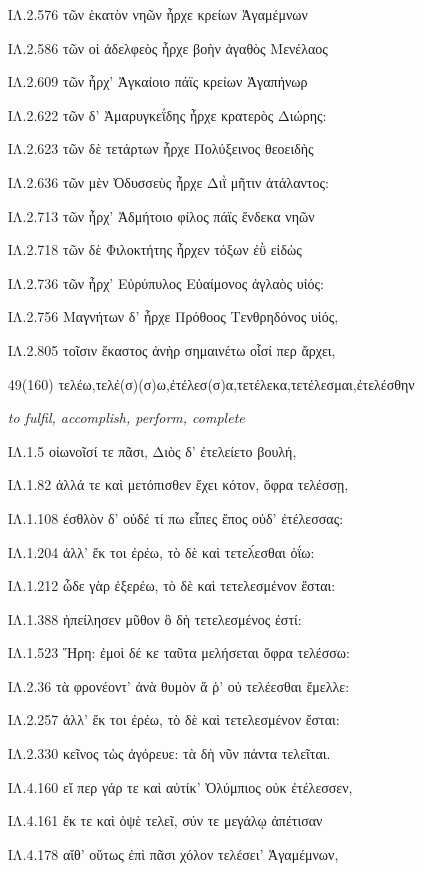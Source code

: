 \begin{enumerate}
{ΙΛ.2.576 τῶν ἑκατὸν νηῶν ἦρχε κρείων Ἀγαμέμνων

ΙΛ.2.586 τῶν οἱ ἀδελφεὸς ἦρχε βοὴν ἀγαθὸς Μενέλαος

ΙΛ.2.609 τῶν ἦρχ' Ἀγκαίοιο πάϊς κρείων Ἀγαπήνωρ

ΙΛ.2.622 τῶν δ' Ἀμαρυγκεΐδης ἦρχε κρατερὸς Διώρης:

ΙΛ.2.623 τῶν δὲ τετάρτων ἦρχε Πολύξεινος θεοειδὴς

ΙΛ.2.636 τῶν μὲν Ὀδυσσεὺς ἦρχε Διῒ μῆτιν ἀτάλαντος:

ΙΛ.2.713 τῶν ἦρχ' Ἀδμήτοιο φίλος πάϊς ἕνδεκα νηῶν

ΙΛ.2.718 τῶν δὲ Φιλοκτήτης ἦρχεν τόξων ἐῢ εἰδὼς

ΙΛ.2.736 τῶν ἦρχ' Εὐρύπυλος Εὐαίμονος ἀγλαὸς υἱός:

ΙΛ.2.756 Μαγνήτων δ' ἦρχε Πρόθοος Τενθρηδόνος υἱός,

ΙΛ.2.805 τοῖσιν ἕκαστος ἀνὴρ σημαινέτω οἷσί περ ἄρχει,

}

\clearpage
\item[\large 49(160)]{\large\g τελέω,τελέ(σ)(σ)ω,ἐτέλεσ(σ)α,τετέλεκα,τετέλεσμαι,ἐτελέσθην} 

\hspace{0.2cm} \textit{to fulfil, accomplish, perform, complete}

{\g
ΙΛ.1.5 οἰωνοῖσί τε πᾶσι, Διὸς δ' ἐτελείετο βουλή,

ΙΛ.1.82 ἀλλά τε καὶ μετόπισθεν ἔχει κότον, ὄφρα τελέσσῃ,

ΙΛ.1.108 ἐσθλὸν δ' οὐδέ τί πω εἶπες ἔπος οὐδ' ἐτέλεσσας:

ΙΛ.1.204 ἀλλ' ἔκ τοι ἐρέω, τὸ δὲ καὶ τετελ́εσθαι ὀΐω:

ΙΛ.1.212 ὧδε γὰρ ἐξερέω, τὸ δὲ καὶ τετελεσμένον ἔσται:

ΙΛ.1.388 ἠπείλησεν μῦθον ὃ δὴ τετελεσμένος ἐστί:

ΙΛ.1.523 Ἥρη: ἐμοὶ δέ κε ταῦτα μελήσεται ὄφρα τελέσσω:

ΙΛ.2.36 τὰ φρονέοντ' ἀνὰ θυμὸν ἅ ῥ' οὐ τελέεσθαι ἔμελλε:

ΙΛ.2.257 ἀλλ' ἔκ τοι ἐρέω, τὸ δὲ καὶ τετελεσμένον ἔσται:

ΙΛ.2.330 κεῖνος τὼς ἀγόρευε: τὰ δὴ νῦν πάντα τελεῖται.

ΙΛ.4.160 εἴ περ γάρ τε καὶ αὐτίκ' Ὀλύμπιος οὐκ ἐτέλεσσεν,

ΙΛ.4.161 ἔκ τε καὶ ὀψὲ τελεῖ, σύν τε μεγάλῳ ἀπέτισαν

ΙΛ.4.178 αἴθ' οὕτως ἐπὶ πᾶσι χόλον τελέσει' Ἀγαμέμνων,

}
\end{enumerate}
